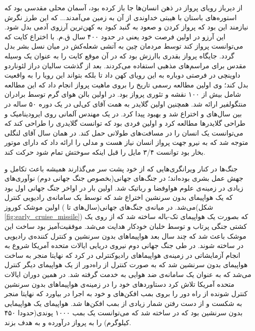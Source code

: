 از دیرباز رویای پرواز در ذهن انسان‌ها جا باز کرده بود، آسمان محلی مقدسی بود که استوره‌های باستان با هیبتی خداوندی از آن به زمین می‌آمدند... که این طرز نگرش نیازمند این بود که پرواز کردن و صعود به گنبد کبود به کهن‌ترین آرزوی آدمی بدل شود. این آرزو در اولین فرصت خود یعنی در حدود ۴۰۰ سال ق.م. با اختراع کایت که می‌توانست پرواز کند توسط مردمان چین به آتشی شعله‌کش در میان نسل بشر بدل گردد. جایگاه پرواز بقدری باارزش بود که در آن موقع کایت را به عنوان یک وسیله مقدس برای مراسم‌های مذهبی استفاده می‌کردند. بعد از گذشت سالیان دراز لئوناردو داوینچی در  فرصتی دوباره به این رویای کهن داد تا بلکه بتواند این رویا را به واقعیت بدل کند؛ وی اولین مطالعه رسمی تاریخ را بروی ماهیت پرواز انجام داد که این مطالعه شامل بیش از ۱۰۰ نقشه و تئوری پرواز بود. در  اولین بالن هوای گرم توسط برادران منتگولفیر ارائه شد. همچنین اولین گلایدر به همت آقای کی‌لی در یک دوره ۵۰ ساله در بین سال‌های  و  اختراع شد و بهبود پیدا کرد. در  یک مهندس آلمانی روی ایرودینامیک و طراحی گلایدرها مطالعه کرد و اولین فردی بود که توانست گلایدری را طراحی کند که می‌توانست یک انسان را در مسافت‌های طولانی حمل کند. در همان سال آقای لنگلی متوجه شد که به نیرو جهت پرواز انسان نیاز هست و مدلی را ارائه داد که دارای موتور بخار بود توانست ۳/۴ مایل را قبل اینکه سوختش تمام شود حرکت کند.

جنگ‌ها در کنار ویرانگری‌هایی که از خود پشت سر می‌گذارند همیشه باعث تکامل و جهش عمل بشری بوده‌اند؛ در جنگ‌های جهانی(بخصوص جنگ جهانی دوم) نوآوری‌های زیادی در زمینه‌ی علوم هواوفضا و رباتیک شد. اولین بار در اواخر جنگ جهانی اول بود که یک هواپیمای بدون سرنشین اختراع شد که توسط یک سامانه‌ی رادیویی کنترل می‌شد. در میانه‌ی جنگ‌های جهانی(سال‌های  تا ) اولین موشک کوروز(شکل \ref{fig:early_cruise_missile}) که بصورت یک هواپیمای تک-باله ساخته شد که از روی یک کشتی جنگی پرتاب و توسط خلبان خودکار هدایت می‌شد. موفقیت‌آمیز بود ساخت این موشک باعث شد که چند سال بعد هواپیماهای بدون سرنشین و کنترل کننده‌ی رادیویی در  ساخته شوند. در طی جنگ جهانی دوم نیروی دریایی ایالات متحده آمریکا شروع به انجام آزمایشاتی در زمینه‌ی هواپیما‌های رادیوکنترلی در  کرد که نهایتا منجر به ساخت هواپیمای بدون سرنشین  شد که به صورت کنترل از راه‌دور از یک هواپیمای دیگر کنترل می‌شد که به عنوان یک سامانه‌ی ضد هوایی به خدمت گرفته شد. در همین دوران ایالات متحده آمریکا تلاش کرد دستاوردهای خود را در زمینه‌ی هواپیماهای بدون سرنشین کنترل شونده از راه دور را بروی بمب افکن‌های  و  خود به اجرا در بیاورد که نهایتا منجر به شکست و از دست رفتن شمار زیادی از بمب افکن‌ها شد. هواپیمای  یک هواپیمایی بدون سرنشین بود که در  ساخته شد که می‌توانست یک بمب ۱۰۰۰ پوندی(حدودا ۴۵۰ کیلوگرم) را به پرواز درآورده و به هدف بزند.


